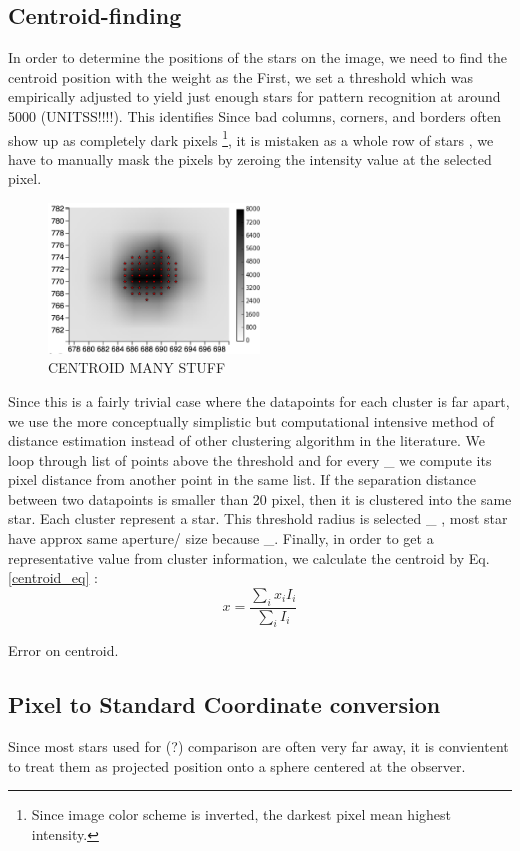 \documentclass[authoryear, 12pt,5p, times]{elsarticle}
\begin{document}
\subsection{Centroid-finding}
In order to determine the positions of the stars on the image, we need to find the centroid position with the weight as the 
First, we set a threshold which was empirically adjusted to yield just enough stars for pattern recognition at around 5000 (UNITSS!!!!). This identifies 
Since bad columns, corners, and borders often show up as completely dark pixels \footnote{Since image color scheme is inverted, the darkest pixel mean highest intensity.}, it is mistaken as a whole row of stars , we have to manually mask the pixels by zeroing the intensity value at the selected pixel.
	\begin{figure}[h!]
\includegraphics[width=0.5\textwidth]{figures/centroid_many}
\caption{CENTROID MANY STUFF}
\label{centroid_many}
\end{figure}
Since this is a fairly trivial case where the datapoints for each cluster is far apart, we use the more conceptually simplistic but computational intensive method of distance estimation instead of other clustering algorithm  in the literature.  We loop through list of points above the threshold and for every \_ we compute its pixel distance from another point in the same list. If the separation distance between two datapoints is smaller than 20 pixel, then it is clustered into the same star. Each cluster represent a star. This threshold radius is selected  \_ , most star have approx same aperture/ size because \_. Finally, in order to get a representative value from cluster information, we calculate the centroid by Eq. \ref{centroid_eq} :
\begin{equation}
x = \frac{\sum \limits_{i} x_i I_i}{\sum\limits_{i} I_i}
\label{centroid_eq}
\end{equation}

Error on centroid. 
\subsection{Pixel to Standard Coordinate conversion}
Since most stars used for (?) comparison are often very far away, it is convientent to treat them as projected position onto a sphere centered at the observer.
\end{document}
